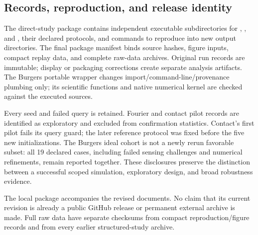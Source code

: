 \documentclass[journal]{IEEEtran}
\begin{document}
\subsection{Records, reproduction, and release identity}
The direct-study package contains independent executable subdirectories for
, , and , their declared
protocols, and commands to reproduce into new output directories. The final
package manifest binds source hashes, figure inputs, compact replay data,
and complete raw-data archives. Original run records are immutable; display
or packaging corrections create separate analysis artifacts. The Burgers
portable wrapper changes import/command-line/provenance plumbing only;
its scientific functions and native numerical kernel are checked against
the executed sources.

Every seed and failed query is retained. Fourier and contact pilot records
are identified as exploratory and excluded from confirmation statistics.
Contact's first pilot fails its query guard; the later reference protocol
was fixed before the five new initializations. The Burgers ideal cohort is
not a newly rerun favorable subset: all 19 declared cases, including failed
sensing challenges and numerical refinements, remain reported together.
These disclosures preserve the distinction between a successful scoped
simulation, exploratory design, and broad robustness evidence.

The local package accompanies the revised documents. No claim that its
current revision is already a public GitHub release or permanent external
archive is made. Full raw data have separate checksums from compact
reproduction/figure records and from every earlier structured-study archive.
%



\end{document}
